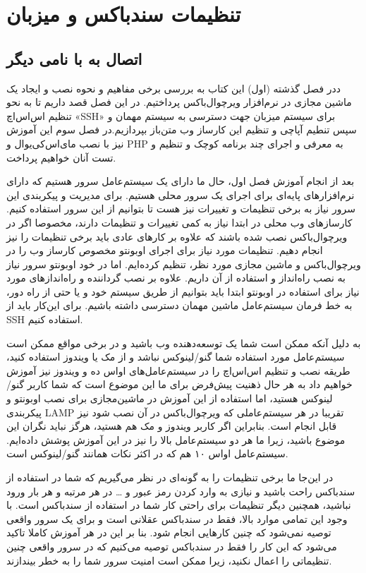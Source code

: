 \chapter{تنظیمات سندباکس و میزبان}
\section{اتصال به 
     با نامی دیگر}
ددر فصل گذشته (اول) این کتاب به بررسی برخی مفاهیم و نحوه نصب و ایجاد یک ماشین مجازی در نرم‌افزار ویرچوال‌باکس پرداختیم. در این فصل قصد داریم تا به نحو تنظیم اس‌اس‌اچ «SSH» برای سیستم میزبان جهت دسترسی به سیستم مهمان و سپس تنطیم آپاچی و تنظیم این کارساز وب متن‌باز بپردازیم.در فصل سوم این آموزش نیز با نصب مای‌اس‌کی‌یو‌ال و PHP به معرفی و اجرای چند برنامه کوچک و تنظیم و تست آنان خواهیم پرداخت.

بعد از انجام آموزش فصل اول، حال ما دارای یک سیستم‌عامل سرور هستیم که دارای نرم‌افزارهای پایه‌ای برای اجرای یک سرور محلی هستیم. برای مدیریت و پیکربندی این سرور نیاز به برخی تنظیمات و تغییرات نیز هست تا بتوانیم از این سرور استفاده کنیم. کارسازهای وب محلی در ابتدا نیاز به کمی تغییرات و تنظیمات دارند، مخصوصا اگر در ویرچوال‌باکس نصب شده باشند که علاوه بر کارهای عادی باید برخی تنظیمات را نیز انجام دهیم. تنظیمات مورد نیاز برای اجرای اوبونتو مخصوص کارساز وب را در ویرچوال‌باکس و ماشین مجازی مورد نظر، تنظیم کرده‌ایم. اما در خود اوبونتو سرور نیاز به نصب راه‌انداز و استفاده از آن داریم. علاوه بر نصب گرداننده و راه‌اندازهای مورد نیاز برای استفاده در اوبونتو ابتدا باید بتوانیم از طریق سیستم خود و یا حتی از راه دور، به خط فرمان سیستم‌عامل ماشین مهمان دسترسی داشته باشیم. برای این‌کار باید از SSH استفاده کنیم.

به دلیل آنکه ممکن است شما یک توسعه‌دهنده وب باشید و در برخی مواقع ممکن است سیستم‌عامل مورد استفاده شما گنو/لینوکس نباشد و از مک یا ویندوز استفاده کنید، طریقه نصب و تنظیم اس‌اس‌اچ را در سیستم‌عامل‌های او‌اس‌ ده و ویندوز نیز آموزش خواهیم داد به هر حال ذهنیت پیش‌فرض برای ما این موضوع است که شما کاربر گنو/لینوکس هستید، اما استفاده از این آموزش در ماشین‌مجازی برای نصب اوبونتو و پیکربندی LAMP تقریبا در هر سیستم‌عاملی که ویرچوال‌باکس در آن نصب شود نیز قابل انجام است. بنابراین اگر کاربر ویندوز و مک هم هستید، هرگز نباید نگران این موضوع باشید، زیرا ما هر دو سیستم‌عامل بالا را نیز در این آموزش پوشش داده‌ایم. سیستم‌عامل او‌اس ۱۰ هم که در اکثر نکات همانند گنو/لینوکس است.

در این‌جا ما برخی تنظیمات را به گونه‌ای در نظر می‌گیریم که شما در استفاده از سندباکس راحت باشید و نیازی به وارد کردن رمز عبور و … در هر مرتبه و هر بار ورود نباشید، همچنین دیگر تنظیمات برای راحتی کار شما در استفاده از سندباکس است.  با وجود این تمامی موارد بالا، فقط در سندباکس عقلانی است و برای یک سرور واقعی توصیه نمی‌شود که چنین کارهایی انجام شود.  بنا بر این در هر آموزش کاملا تاکید می‌شود که این کار را فقط در سندباکس توصیه می‌کنیم  که در سرور واقعی چنین تنظیماتی را اعمال نکنید، زیرا ممکن است امنیت سرور شما را به خطر بیندازند.

